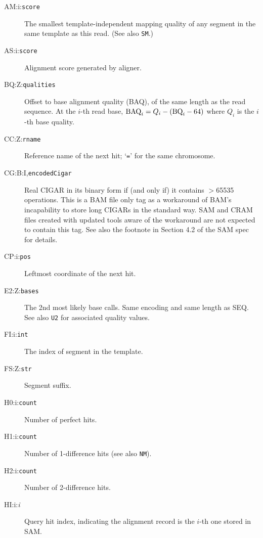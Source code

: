 \documentclass[10pt]{article}
\newcommand{\tagvalue}[1]{{\tt #1}}
\begin{document}
\begin{description}
\item[AM:i:\tagvalue{score}]
The smallest template-independent mapping quality of any segment in the same template as this read.
(See also {\tt SM}.)

\item[AS:i:\tagvalue{score}]
Alignment score generated by aligner.

\item[BQ:Z:\tagvalue{qualities}]
Offset to base alignment quality (BAQ), of the same length as the read sequence.
At the $i$-th read base, ${\rm BAQ}_i=Q_i-({\rm BQ}_i-64)$ where $Q_i$ is the $i$-th base quality.

\item[CC:Z:\tagvalue{rname}]
Reference name of the next hit; `{\tt =}' for the same chromosome.

\item[CG:B:I,\tagvalue{encodedCigar}]
Real CIGAR in its binary form if (and only if) it contains $>$65535 operations. This is
a BAM file only tag as a workaround of BAM's incapability to store long CIGARs
in the standard way. SAM and CRAM files created with updated tools aware of the
workaround are not expected to contain this tag. See also the footnote in
Section 4.2 of the SAM spec for details.

\item[CP:i:\tagvalue{pos}]
Leftmost coordinate of the next hit.

\item[E2:Z:\tagvalue{bases}]
The 2nd most likely base calls. Same encoding and same length as {\sf SEQ}.
See also {\tt U2} for associated quality values.

\item[FI:i:\tagvalue{int}]
The index of segment in the template.

\item[FS:Z:\tagvalue{str}]
Segment suffix.

\item[H0:i:\tagvalue{count}]
Number of perfect hits.

\item[H1:i:\tagvalue{count}]
Number of 1-difference hits (see also {\tt NM}).

\item[H2:i:\tagvalue{count}]
Number of 2-difference hits.

\item[HI:i:\emph{i}]
Query hit index, indicating the alignment record is the $i$-th one stored
in SAM.


\end{description}
\end{document}
